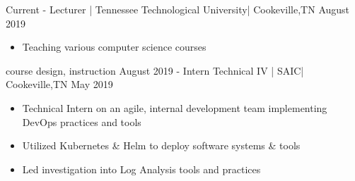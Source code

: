 
\begin{experiences}
\experience
    {Current -} {Lecturer | Tennessee Technological University}{| Cookeville,}{TN}
    {August 2019}    {
                        \begin{itemize}
                            \item {Teaching various computer science courses}
                      \end{itemize}
                    }
                    {course design, instruction}
  \emptySeparator
\experience
    {August 2019 -}   {Intern Technical IV | SAIC}{| Cookeville,}{TN}
    {May 2019} {
                        \begin{itemize}
                            \item {Technical Intern on an agile, internal development team implementing DevOps practices and tools}
                            \item {Utilized Kubernetes \& Helm to deploy software systems \& tools}
                            \item {Led investigation into Log Analysis tools and practices}


\end{itemize}}
\end{experiences}
